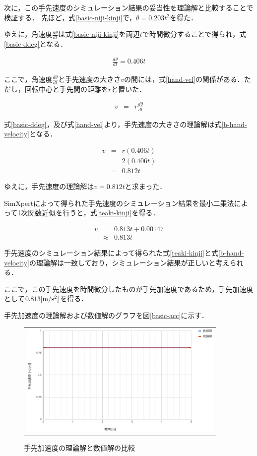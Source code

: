 次に，この手先速度のシミュレーション結果の妥当性を理論解と比較することで検証する．
先ほど，式\ref{basic-niji-kinji}で，\(\theta = 0.203t^2\)を得た．

ゆえに，角速度\(\frac{d\theta}{dt}\)は式\ref{basic-niji-kinji}を両辺\(t\)で時間微分することで得られ，式\ref{basic-ddeg}となる．

\begin{eqnarray}
  \frac{d\theta}{dt} = 0.406t
  \label{basic-ddeg}
\end{eqnarray}

ここで，角速度\(\frac{d\theta}{dt}\)と手先速度の大きさ\(v\)の間には，式\ref{hand-vel}の関係がある．ただし，回転中心と手先間の距離を\(r\)と置いた．

\begin{eqnarray}
  v &=& r\frac{d\theta}{dt}
  \label{hand-vel}
\end{eqnarray}

式\ref{basic-ddeg}，及び式\ref{hand-vel}より，手先速度の大きさの理論解は式\ref{b-hand-velocity}となる．

\begin{eqnarray}
  v &=& r(0.406t) \nonumber \\
    &=& 2(0.406t) \nonumber \\
    &=& 0.812t
  \label{b-hand-velocity}
\end{eqnarray}

ゆえに，手先速度の理論解は\(v=0.812t\)と求まった．

SimXpertによって得られた手先速度のシミュレーション結果を最小二乗法によって1次関数近似を行うと，式\ref{teaki-kinji}を得る．

\begin{eqnarray}
 v &=& 0.813t+0.00147 \nonumber \\
 &\approx& 0.813t 
  \label{teaki-kinji}
\end{eqnarray}

手先速度のシミュレーション結果によって得られた式\ref{teaki-kinji}と式\ref{b-hand-velocity}の理論解は一致しており，シミュレーション結果が正しいと考えられる．

ここで，この手先速度を時間微分したものが手先加速度であるため，手先加速度として\(0.813[\rm m/s^2]\)を得る．

手先加速度の理論解および数値解のグラフを図\ref{basic-acc}に示す．

\begin{figure}[htbp]
  \begin{center}
    \begin{tabular}{c}
      \includegraphics[height=5.5cm]{img/eps/basis-acc.eps}
    \end{tabular}
    \caption{手先加速度の理論解と数値解の比較}
    \label{bacic-acc}
  \end{center}
\end{figure}
